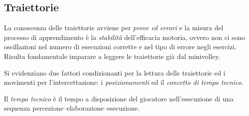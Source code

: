 \subsection{Traiettorie}
La conoscenza delle traiettorie avviene per \emph{prove ed errori} e la
misura del processo di apprendimento è la \emph{stabilità} dell'efficacia
motoria, ovvero non ci sono oscillazioni nel numero di esecuzioni corrette e
nel tipo di errore negli esercizi.
Risulta fondamentale imparare a leggere le traiettorie già dal minivolley.

Si evidenziano due fattori condizionanti per la lettura delle traiettorie
ed i movimenti per l'intercettazione: i \emph{posizionamenti} ed il
\emph{concetto di tempo tecnico}.

\begin{libro}
Il \emph{tempo tecnico} è il tempo a disposizione del giocatore nell'esecuzione
di una sequenza percezione--elaborazione--esecuzione.
\end{libro}

